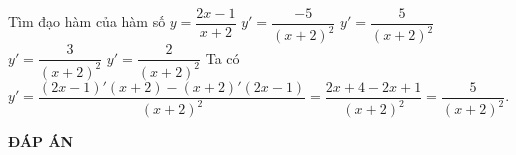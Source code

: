 \begin{ex}%
	Tìm đạo hàm của hàm số $y=\dfrac{2x-1}{x+2}$
	\choice
	{$y'=\dfrac{-5}{(x+2)^2}$}
	{\True $y'=\dfrac{5}{(x+2)^2}$}
	{$y'=\dfrac{3}{(x+2)^2}$}
	{$y'=\dfrac{2}{(x+2)^2}$}
	\loigiai
	{
		Ta có $y'=\dfrac{(2x-1)'(x+2)-(x+2)'(2x-1)}{(x+2)^2}=\dfrac{2x+4-2x+1}{(x+2)^2}=\dfrac{5}{(x+2)^2}.$
	}
\end{ex}

\newpage
\begin{center}
	\textbf{ĐÁP ÁN}
\end{center}
\begin{multicols}{10}
	 
\end{multicols}
